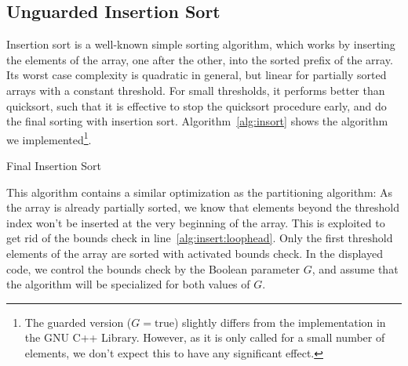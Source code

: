 \documentclass[sigplan,10pt,anonymous,review]{acmart}\settopmatter{printfolios=true,printccs=false,printacmref=false}
\theoremstyle{definition}
\begin{document}
  \subsection{Unguarded Insertion Sort}
  Insertion sort is a well-known simple sorting algorithm, which works by inserting the elements of the
  array, one after the other, into the sorted prefix of the array. Its worst case complexity is quadratic in general,
  but linear for partially sorted arrays with a constant threshold. For small thresholds, it performs better than quicksort,
  such that it is effective to stop the quicksort procedure early, and do the final sorting with insertion sort.
  Algorithm~\ref{alg:insort} shows the algorithm we implemented\footnote{The guarded
  version ($G=\textrm{true}$) slightly differs from the implementation in the GNU C++ Library. However, as it is only called for a small
  number of elements, we don't expect this to have any significant effect.}.

  \begin{algorithm}
  \begin{algorithmic}[1]
       \label{alg:insert:loophead}
      \EndWhile
    \EndProcedure

      \EndWhile
    \EndProcedure

      \Else
      \EndIf
    \EndProcedure
  \end{algorithmic}
  \caption{Final Insertion Sort}\label{alg:insort}
  \end{algorithm}

  This algorithm contains a similar optimization as the partitioning algorithm: As the array is already partially sorted,
  we know that elements beyond the threshold index won't be inserted at the very beginning of the array.
  This is exploited to get rid of the bounds check in line~\ref{alg:insert:loophead}.
  Only the first $\textrm{threshold}$ elements of the array are sorted with activated bounds check. In the displayed code, we control
  the bounds check by the Boolean parameter $G$, and assume that the algorithm will be specialized for both values of $G$.
\end{document}
